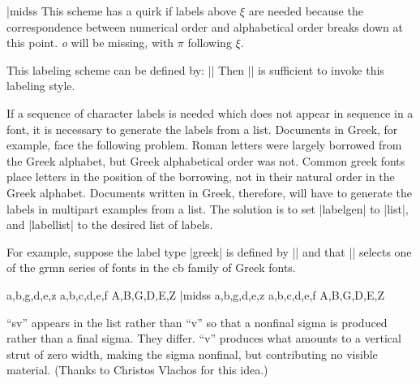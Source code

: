 \beginss
\pex[labelgen=char,pexcnt=11,
   everylabel=\mit]
\a
\a
\a
\a
\xe|midss
\pex[labelgen=char,pexcnt=11,
   everylabel=\mit]
\a
\a
\a
\a
\xe
\endss
\noindent This scheme has a quirk if labels above $\xi$ are
needed because the correspondence between numerical order and
alphabetical order breaks down at this point.  {\it o} will be
missing, with $\pi$ following $\xi$.

This labeling scheme can be defined by:
\medskip
\noindent
||
\medskip
\noindent Then |\pex[labeltype=greekmath]| is sufficient to
invoke this labeling style.

If a sequence of character labels is needed which does not appear
in sequence in a font, it is necessary to generate the labels
from a list.  Documents in Greek, for example, face the following
problem.  Roman letters were largely borrowed from the Greek
alphabet, but Greek alphabetical order was not.  Common greek
fonts place letters in the position of the borrowing, not in
their natural order in the Greek alphabet.  Documents written in
Greek, therefore, will have to generate the labels in multipart
examples from a list. The solution is to set |labelgen| to
|list|, and |labellist| to the desired list of labels.

For example, suppose the label type |greek| is defined by
\medskip
\noindent ||
\medskip
\noindent and that |\gr| selects one of the grmn series of fonts
in the cb family of Greek fonts.

\begingroup
\gr


\beginss
\gr
\pex[labeltype=greek]
\a a,b,g,d,e,z
\a a,b,c,d,e,f
\a A,B,G,D,E,Z
\xe|midss
\pex[labeltype=greek]
\a a,b,g,d,e,z
\a a,b,c,d,e,f
\a A,B,G,D,E,Z
\xe
\endss
\endgroup

\noindent ``sv'' appears in the list rather than ``v'' so that a
nonfinal sigma is produced rather than a final sigma.  They
differ.  ``v'' produces what amounts to a vertical strut of zero
width, making the sigma nonfinal, but contributing no visible
material. (Thanks to Christos Vlachos for this idea.)

